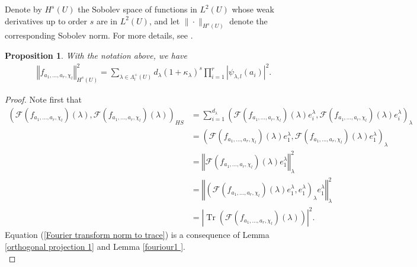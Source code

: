 \documentclass[11pt,a4paper]{amsart}
\DeclareMathOperator{\Tr}{Tr}
\newtheorem{proposition}[theorem]{Proposition}
\theoremstyle{definition}
\numberwithin{equation}{section}
\begin{document}
Denote by $H^s(U)$ the Sobolev space of functions in 
$L^2(U)$ whose weak derivatives up to order $s$ are in $L^2(U)$, and let 
$\|\cdot\|_{H^s(U)}$ denote the corresponding Sobolev norm. For more details, 
see \cite{anchouche2}. 
\begin{proposition}\label{Sobloev norm estimation}
With the notation above, we have
	\begin{align*}
	\left\Vert  f_{a_{1},...,a_{r},\chi_l}\right\Vert _{H^{s}\left(U\right)}^{2}%
	=\sum\limits_{\lambda\in \Lambda_l^+\left(U \right)
		}d_\lambda\left(  1+\kappa_\lambda\right)  ^{s}\prod\limits_{i=1}^{r}\left\vert
	\psi_{\lambda,l}\left(a_i\right)  \right\vert ^{2}. 
\end{align*}		
\end{proposition} 
\begin{proof}
	Note first that 
	\begin{align}
	\left( \mathcal{F}\left(  f_{a_{1},...,a_{r},\chi_l}\right)(\lambda) , \mathcal{F} ( f_{a_{1},...,a_{r},\chi_l})(\lambda) \right)_{HS} &= \sum_{i=1}^{d_\lambda} \left( \mathcal{F}\left(  f_{a_{1},...,a_{r},\chi_l}\right)(\lambda)e_i^\lambda, \mathcal{F}\left(  f_{a_{1},...,a_{r},\chi_l}\right)(\lambda)e_i^\lambda\right)_\lambda
	\nonumber\\&= \left( \mathcal{F}\left(  f_{a_{1},...,a_{r},\chi_l}\right)(\lambda)e_1^\lambda, \mathcal{F}\left(  f_{a_{1},...,a_{r},\chi_l}\right)(\lambda)e_1^\lambda\right)_\lambda
	\nonumber\\&=\left\Vert \mathcal{F}\left(  f_{a_{1},...,a_{r},\chi_l}\right)(\lambda)e_1^\lambda \right\Vert_\lambda^2             
	 \nonumber\\&=\left\Vert \left(  \mathcal{F}\left(  f_{a_{1},...,a_{r},\chi_l}\right)(\lambda)e_1^\lambda,e_1^\lambda \right)_\lambda e_1^\lambda\right\Vert_\lambda^2 \nonumber 
	  \\
	&=\left\vert\Tr\left(\mathcal{F}\left(  f_{a_{1},...,a_{r},\chi_l}\right)(\lambda)\right) \right\vert^2. & \label{Fourier transform norm to trace}
	\end{align} 
{  	Equation (\ref{Fourier transform norm to trace}) is a consequence of Lemma  \ref{orthogonal projection 1} and Lemma \ref{fouriour1 }.} \\
	


\end{proof}
\end{document}
